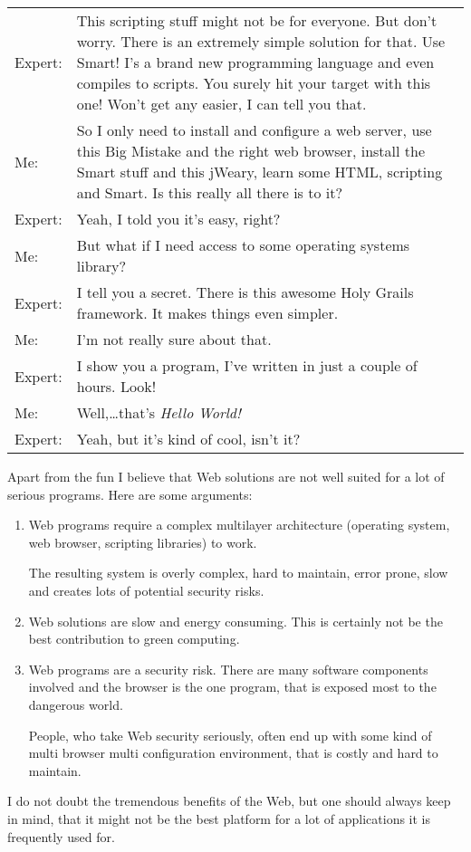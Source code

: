 \begin{longtable}{lp{11cm}}
Expert: & This scripting stuff might not be for everyone. But don't
worry. There is an extremely simple solution for that. Use Smart! I's a
brand new programming language and even compiles to scripts. You surely
hit your target with this one! Won't get any easier, I can tell you
that.\\
Me: & So I only need to install and configure a web server, use this Big
Mistake and the right web browser, install the Smart stuff and this
jWeary, learn some HTML, scripting and Smart. Is this really all there
is to it?\\
Expert: & Yeah, I told you it's easy, right?\\
Me: & But what if I need access to some operating systems library?\\
Expert: & I tell you a secret. There is this awesome Holy Grails
framework. It makes things even simpler.\\
Me: & I'm not really sure about that.\\
Expert: & I show you a program, I've written in just a couple of hours.
Look!\\
Me: & Well,\dots that's \emph{Hello World!}\\
Expert: & Yeah, but it's kind of cool, isn't it?
\end{longtable}

Apart from the fun I believe that Web solutions are not well suited for
a lot of serious programs. Here are some arguments:

\begin{enumerate}
\item
  Web programs require a complex multilayer architecture (operating
  system, web browser, scripting libraries) to work.

  The resulting system is overly complex, hard to maintain, error prone,
  slow and creates lots of potential security risks.
\item
  Web solutions are slow and energy consuming. This is certainly not be
  the best contribution to green computing.
\item
  Web programs are a security risk. There are many software components
  involved and the browser is the one program, that is exposed most to
  the dangerous world.

  People, who take Web security seriously, often end up with some kind
  of multi browser multi configuration environment, that is costly and
  hard to maintain.
\end{enumerate}

I do not doubt the tremendous benefits of the Web, but one should always
keep in mind, that it might not be the best platform for a lot of
applications it is frequently used for.

